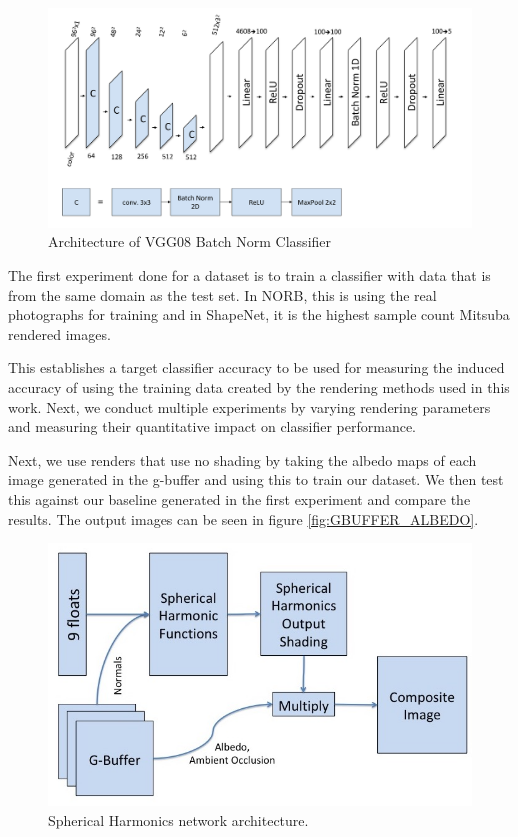 \documentclass[10pt,twocolumn,letterpaper]{article}
\begin{document}
\begin{figure}[h!]
\centering
\includegraphics[width=1.0\columnwidth]{./assets/vgg08_diagram.pdf}
\caption{Architecture of VGG08 Batch Norm Classifier}
\label{fig:VGG_DAIGRAM}
\end{figure}

The first experiment done for a dataset is to train a classifier with data that is from the same domain as the test set.  In NORB, this is using the real photographs for training and in ShapeNet, it is the highest sample count Mitsuba rendered images. %

This establishes a target classifier accuracy to be used for measuring the induced accuracy of using the training data created by the rendering methods used in this work. Next, we conduct multiple experiments by varying rendering parameters and measuring their quantitative impact on classifier performance.

Next, we use renders that use no shading by taking the albedo maps of each image generated in the g-buffer and using this to train our dataset. We then test this against our baseline generated in the first experiment and compare the results. The output images can be seen in figure \ref{fig:GBUFFER_ALBEDO}.

\begin{figure}[h!]
\centering
\includegraphics[width=1.0\columnwidth]{./assets/SH_model.jpg}
\caption{Spherical Harmonics network architecture.}
\label{fig:SHN}
\end{figure}
\end{document}
